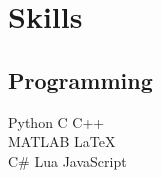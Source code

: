 \documentclass[]{deedy-resume-openfont}
\begin{document}
\begin{minipage}[t]{0.33\textwidth}




\section{Skills}
\subsection{Programming}
Python \textbullet{}   C \textbullet{} C++ \\
MATLAB \textbullet{} \LaTeX \\ %
C\# \textbullet{} Lua \textbullet{} JavaScript
\sectionsep


\end{minipage}
\end{document}
